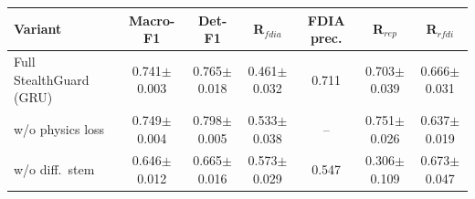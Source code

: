 \begin{tabular}{lcccccc}
\toprule
Variant & Macro-F1 & Det-F1 & R$_{fdia}$ & FDIA prec. & R$_{rep}$ & R$_{rfdi}$ \\
\midrule
Full StealthGuard (GRU) & 0.741$\pm$0.003 & 0.765$\pm$0.018 & 0.461$\pm$0.032 & 0.711 & 0.703$\pm$0.039 & 0.666$\pm$0.031 \\
w/o physics loss & 0.749$\pm$0.004 & 0.798$\pm$0.005 & 0.533$\pm$0.038 & -- & 0.751$\pm$0.026 & 0.637$\pm$0.019 \\
w/o diff.\ stem & 0.646$\pm$0.012 & 0.665$\pm$0.016 & 0.573$\pm$0.029 & 0.547 & 0.306$\pm$0.109 & 0.673$\pm$0.047 \\
\bottomrule
\end{tabular}
